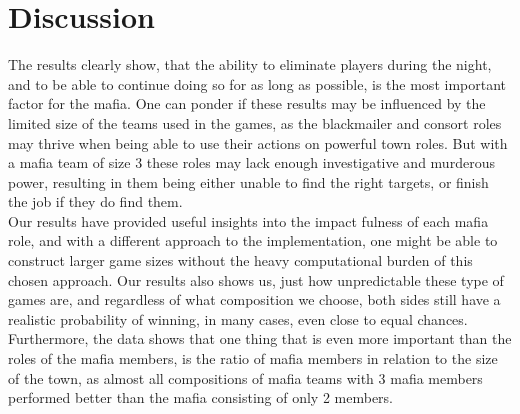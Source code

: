 \section{Discussion}\label{sec:discussion}
The results clearly show, that the ability to eliminate players during the 
night, and to be able to continue doing so for as long as possible, is the most 
important factor for the mafia. One can ponder if these results may be 
influenced by the limited size of the
teams used in the games, as the blackmailer and consort roles may thrive when
being able to use their actions on powerful town roles. But with a mafia team
of size 3 these roles may lack enough investigative and murderous power,
resulting in them being either unable to find the right targets, or finish the
job if they do find them.\\ Our results have provided useful insights into the
impact fulness of each mafia role, and with a different approach to the
implementation, one might be able to construct larger game sizes without the
heavy computational burden of this chosen approach. Our results also shows us,
just how unpredictable these type of games are, and regardless of what
composition we choose, both sides still have a realistic probability of
winning, in many cases, even close to equal chances.\\ Furthermore, the data
shows that one thing that is even more important than the roles of the mafia
members, is the ratio of mafia members in relation to the size of the town, as
almost all compositions of mafia teams with 3 mafia members performed better
than the mafia consisting of only 2 members.
